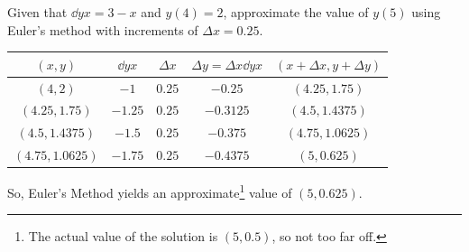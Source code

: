 \begin{example}
	Given that $\dd{y}{x}=3-x$ and $y(4)=2$, approximate the value of $y(5)$ using Euler's method with increments of $\Delta x = 0.25$.
\end{example}
\begin{table}[H]
\begin{center}
	\begin{tabular}{|c|c|c|c|c|}
		\hline
		$(x,y)$ & $\dd{y}{x}$ & $\Delta x$ & $\Delta y = \Delta x\dd{y}{x}$ & $(x+\Delta x, y+\Delta y)$ \\
		\hline
		$(4,2)$ & $-1$ & $0.25$ & $-0.25$ & $(4.25,1.75)$ \\
		\hline
		$(4.25,1.75)$ & $-1.25$ & $0.25$ & $-0.3125$ & $(4.5,1.4375)$ \\
		\hline
		$(4.5,1.4375)$ & $-1.5$ & $0.25$ & $-0.375$ & $(4.75,1.0625)$ \\
		\hline
		$(4.75,1.0625)$ & $-1.75$ & $0.25$ & $-0.4375$ & $(5,0.625)$ \\
		\hline
	\end{tabular}
\end{center}
\end{table}
\indent
So, Euler's Method yields an approximate\footnote{The actual value of the solution is $(5,0.5)$, so not too far off.} value of $(5,0.625)$.